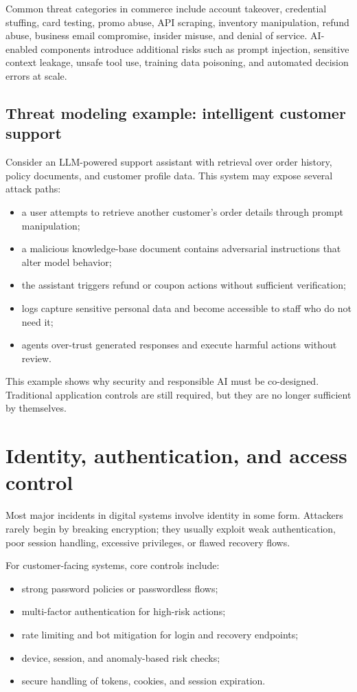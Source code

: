 Common threat categories in commerce include account takeover, credential stuffing, card testing, promo abuse, API scraping, inventory manipulation, refund abuse, business email compromise, insider misuse, and denial of service. AI-enabled components introduce additional risks such as prompt injection, sensitive context leakage, unsafe tool use, training data poisoning, and automated decision errors at scale.

\subsection{Threat modeling example: intelligent customer support}
Consider an LLM-powered support assistant with retrieval over order history, policy documents, and customer profile data. This system may expose several attack paths:
\begin{itemize}
  \item a user attempts to retrieve another customer's order details through prompt manipulation;
  \item a malicious knowledge-base document contains adversarial instructions that alter model behavior;
  \item the assistant triggers refund or coupon actions without sufficient verification;
  \item logs capture sensitive personal data and become accessible to staff who do not need it;
  \item agents over-trust generated responses and execute harmful actions without review.
\end{itemize}

This example shows why security and responsible AI must be co-designed. Traditional application controls are still required, but they are no longer sufficient by themselves.

\section{Identity, authentication, and access control}
Most major incidents in digital systems involve identity in some form. Attackers rarely begin by breaking encryption; they usually exploit weak authentication, poor session handling, excessive privileges, or flawed recovery flows.

For customer-facing systems, core controls include:
\begin{itemize}
  \item strong password policies or passwordless flows;
  \item multi-factor authentication for high-risk actions;
  \item rate limiting and bot mitigation for login and recovery endpoints;
  \item device, session, and anomaly-based risk checks;
  \item secure handling of tokens, cookies, and session expiration.
\end{itemize}

